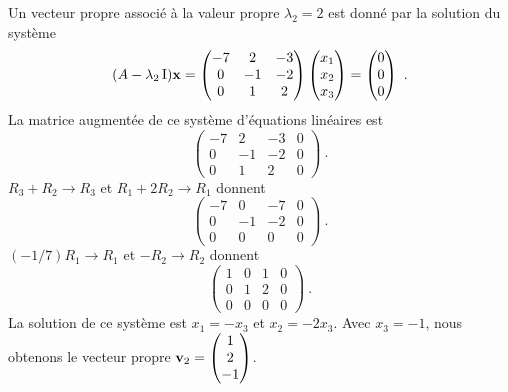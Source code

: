 {Un vecteur propre associé à la valeur propre
$\lambda_2 = 2$ est donné par la solution du système
\[
(A-\lambda_2\operatorname{I})\mathbf{x} = 
\begin{pmatrix}
-7 & 2 & -3 \\ 0 & -1 & -2 \\ 0 & 1 & 2
\end{pmatrix}
\begin{pmatrix} x_1 \\ x_2 \\ x_3 \end{pmatrix}
= \begin{pmatrix} 0 \\ 0 \\ 0 \end{pmatrix} \ .
\]
La matrice augmentée de ce système d'équations linéaires est
\[
\left(\begin{array}{ccc|c}
-7 & 2 & -3 & 0 \\ 0 & -1 & -2 & 0 \\ 0 & 1 & 2 & 0
\end{array}\right) \ .
\]
$R_3+R_2 \rightarrow R_3$ et $R_1+2R_2 \rightarrow R_1$ donnent
\[
\left(\begin{array}{ccc|c}
-7 & 0 & -7 & 0 \\ 0 & -1 & -2 & 0 \\ 0 & 0 & 0 & 0
\end{array}\right) \ .
\]
$(-1/7)R_1 \rightarrow R_1$ et $-R_2\rightarrow R_2$ donnent
\[
\left(\begin{array}{ccc|c}
1 & 0 & 1 & 0 \\ 0 & 1 & 2 & 0 \\ 0 & 0 & 0 & 0
\end{array}\right) \ .
\]
La solution de ce système est $x_1=-x_3$ et $x_2=-2x_3$.  Avec $x_3=-1$,
nous obtenons le vecteur propre
$\displaystyle \mathbf{v}_2 = \begin{pmatrix} 1 \\ 2 \\ -1 \end{pmatrix}$.

}
